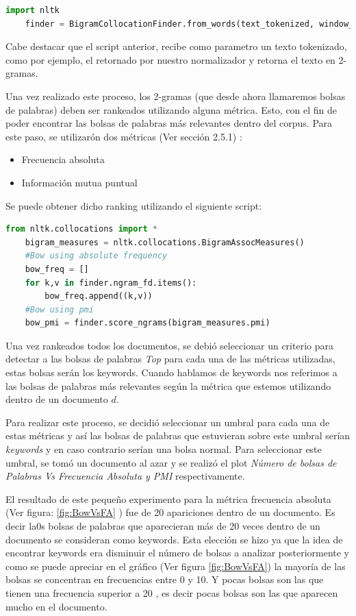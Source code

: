     \begin{lstlisting}[language=Python]
    import nltk
    finder = BigramCollocationFinder.from_words(text_tokenized, window_size = 3)
    \end{lstlisting}
    
    Cabe destacar que el script anterior, recibe como parametro un texto tokenizado, como por ejemplo, el retornado por nuestro normalizador y retorna el texto en 2-gramas.
    
    Una vez realizado este proceso, los 2-gramas (que desde ahora llamaremos bolsas de palabras) deben ser rankeados utilizando alguna métrica. Esto, con el fin de poder encontrar las bolsas de palabras más relevantes dentro del corpus. Para este paso, se utilizarón dos métricas (Ver sección 2.5.1) :
    
    \begin{itemize}
        \item Frecuencia absoluta
        \item Información mutua puntual
    \end{itemize}
    
    Se puede obtener dicho ranking utilizando el siguiente script:
    \begin{lstlisting}[language=Python]
    from nltk.collocations import *
    bigram_measures = nltk.collocations.BigramAssocMeasures()
    #Bow using absolute frequency 
    bow_freq = []
    for k,v in finder.ngram_fd.items():
        bow_freq.append((k,v))
    #Bow using pmi
    bow_pmi = finder.score_ngrams(bigram_measures.pmi)
    \end{lstlisting}
    
     Una vez rankeados todos los documentos, se debió seleccionar un criterio para detectar a las bolsas de palabras \textit{Top} para cada una de las métricas utilizadas, estas bolsas serán los keywords. Cuando hablamos de keywords nos referimos a las bolsas de palabras más relevantes según la métrica que estemos utilizando dentro de un documento $d$. 
    
    Para realizar este proceso, se decidió seleccionar un umbral para cada una de estas métricas y así las bolsas de palabras que estuvieran sobre este umbral serían \textit{keywords} y en caso contrario serían una bolsa normal. Para seleccionar este umbral, se tomó un documento al azar y se realizó el plot \textit{Número de bolsas de Palabras Vs Frecuencia Absoluta y PMI} respectivamente.
    
    El resultado de este pequeño experimento para la métrica frecuencia absoluta (Ver figura: \ref{fig:BowVsFA} ) fue de 20 apariciones dentro de un documento. Es decir la0s bolsas de palabras que aparecieran más de 20 veces dentro de un documento se consideran como keywords. Esta elección se hizo ya que la idea de encontrar keywords era disminuir el número de bolsas a analizar posteriormente y como se puede apreciar en el gráfico (Ver figura \ref{fig:BowVsFA}) la mayoría de las bolsas se concentran en frecuencias entre 0 y 10. Y pocas bolsas son las que tienen una frecuencia superior a 20 , es decir pocas bolsas son las que aparecen mucho en el documento.
    
